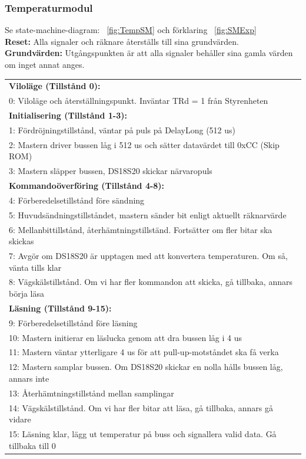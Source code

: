\documentclass[a4paper,11pt]{article}
\begin{document}
		\subsubsection{Temperaturmodul}
			Se state-machine-diagram: ~\ref{fig:TempSM} och förklaring ~\ref{fig:SMExp}\\
			{\bf Reset:} Alla signaler och räknare återställs till sina grundvärden.\\
			{\bf Grundvärden:} Utgångspunkten är att alla signaler behåller sina gamla värden om inget annat anges.\\
			\begin{tabular}{l}
				\\{\bf Viloläge (Tillstånd 0):}\\
				0: Viloläge och återställningspunkt. Inväntar TRd = 1 från Styrenheten\\
				{\bf Initialisering (Tillstånd 1-3):}\\
				1: Fördröjningstillstånd, väntar på puls på DelayLong (512 us)\\
				2: Mastern driver bussen låg i 512 us och sätter datavärdet till 0xCC (Skip ROM)\\
				3: Mastern släpper bussen, DS18S20 skickar närvaropuls\\
				{\bf Kommandoöverföring (Tillstånd 4-8):}\\
				4: Förberedelsetillstånd före sändning\\
				5: Huvudsändningstillståndet, mastern sänder bit enligt aktuellt räknarvärde\\
				6: Mellanbittillstånd, återhämtningstillständ. Fortsätter om fler bitar ska skickas\\
				7: Avgör om DS18S20 är upptagen med att konvertera temperaturen. Om så, vänta tills klar\\
				8: Vägskälstillstånd. Om vi har fler kommandon att skicka, gå tillbaka, annars börja läsa\\
				{\bf Läsning (Tillstånd 9-15):}\\
				9:  Förberedelsetillstånd före läsning\\
				10: Mastern initierar en läslucka genom att dra bussen låg i 4 us\\
				11: Mastern väntar ytterligare 4 us för att pull-up-motståndet ska få verka\\
				12: Mastern samplar bussen. Om DS18S20 skickar en nolla hålls bussen låg, annars inte\\
				13: Återhämtningstillstånd mellan samplingar\\
				14: Vägskälstillstånd. Om vi har fler bitar att läsa, gå tillbaka, annars gå vidare\\
				15: Läsning klar, lägg ut temperatur på buss och signallera valid data. Gå tillbaka till 0\\
			\end{tabular}
\end{document}
